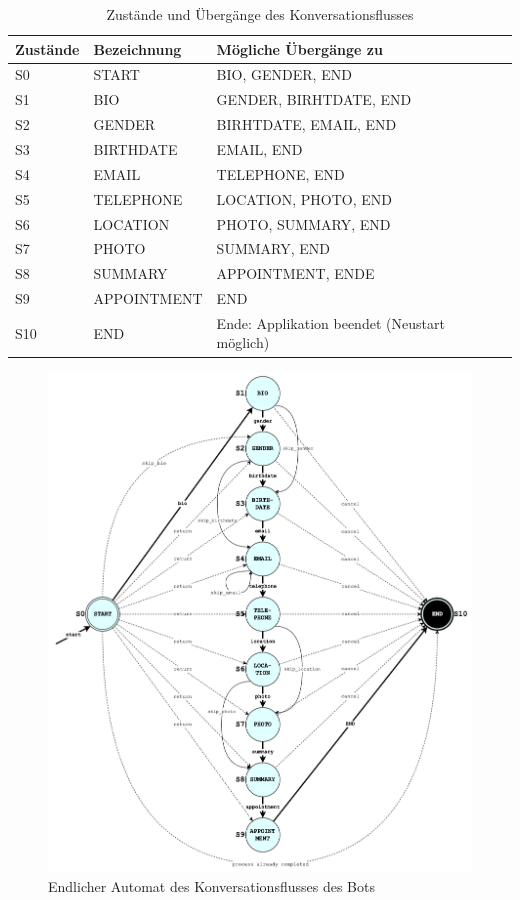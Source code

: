 	\label{states table}
	\begin{table} %
		\centering
		\begin{tabular}{l | l l l l}
			\textbf{Zustände} 	&		\textbf{Bezeichnung}	&		\textbf{Mögliche Übergänge zu}\\
			\hline
			S0 					&		START 					&		BIO, GENDER, END\\
			S1 					&		BIO 					&		GENDER, BIRHTDATE, END\\
			S2 					&		GENDER 					&		BIRHTDATE, EMAIL, END\\
			S3 					&		BIRTHDATE 				&		EMAIL, END\\
			S4 					&		EMAIL 					&		TELEPHONE, END\\
			S5 					&		TELEPHONE 				&		LOCATION, PHOTO, END\\
			S6 					&		LOCATION 				&		PHOTO, SUMMARY, END\\
			S7 					&		PHOTO 					&		SUMMARY, END\\
			S8 					&		SUMMARY 				&		APPOINTMENT, ENDE\\
			S9 					&		APPOINTMENT				&		END\\
			S10 				&		END 					&		Ende: Applikation beendet (Neustart möglich)\\
			
		\end{tabular}
		\caption{Zustände und Übergänge des Konversationsflusses}
		\label{tab: states}
	\end{table}
	
	\begin{figure} %
		\centering
		\includegraphics[width=1.0\textwidth]{images/220328_PA28464_State-Machine.png}
		\caption{Endlicher Automat des Konversationsflusses des Bots}
		\label{fig: state machine}
	\end{figure}
	